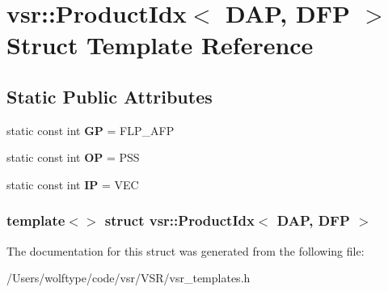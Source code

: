 \hypertarget{structvsr_1_1_product_idx_3_01_d_a_p_00_01_d_f_p_01_4}{\section{vsr\-:\-:Product\-Idx$<$ D\-A\-P, D\-F\-P $>$ Struct Template Reference}
\label{structvsr_1_1_product_idx_3_01_d_a_p_00_01_d_f_p_01_4}
}
\subsection*{Static Public Attributes}
\begin{DoxyCompactItemize}
\item 
\hypertarget{structvsr_1_1_product_idx_3_01_d_a_p_00_01_d_f_p_01_4_a99084b13025904e968a8b55bccaf7bdb}{static const int {\bfseries G\-P} = F\-L\-P\-\_\-\-A\-F\-P}\label{structvsr_1_1_product_idx_3_01_d_a_p_00_01_d_f_p_01_4_a99084b13025904e968a8b55bccaf7bdb}

\item 
\hypertarget{structvsr_1_1_product_idx_3_01_d_a_p_00_01_d_f_p_01_4_a564daf727d87b07759ae71b4745e128d}{static const int {\bfseries O\-P} = P\-S\-S}\label{structvsr_1_1_product_idx_3_01_d_a_p_00_01_d_f_p_01_4_a564daf727d87b07759ae71b4745e128d}

\item 
\hypertarget{structvsr_1_1_product_idx_3_01_d_a_p_00_01_d_f_p_01_4_a19b08df1911d2005b2dd1beefe4ff9c8}{static const int {\bfseries I\-P} = V\-E\-C}\label{structvsr_1_1_product_idx_3_01_d_a_p_00_01_d_f_p_01_4_a19b08df1911d2005b2dd1beefe4ff9c8}

\end{DoxyCompactItemize}
\subsubsection*{template$<$$>$ struct vsr\-::\-Product\-Idx$<$ D\-A\-P, D\-F\-P $>$}



The documentation for this struct was generated from the following file\-:\begin{DoxyCompactItemize}
\item 
/\-Users/wolftype/code/vsr/\-V\-S\-R/vsr\-\_\-templates.\-h\end{DoxyCompactItemize}
